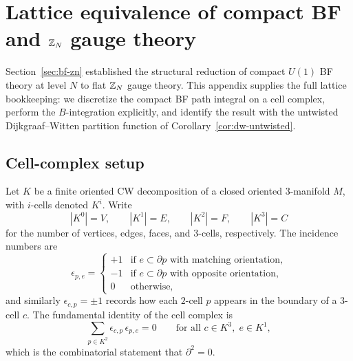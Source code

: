 
\label{app:bf-zn}

\section{Lattice equivalence of compact BF and \texorpdfstring{$\mathbb{Z}_N$}{Z\_N} gauge theory}\label{sec:appD-bf-lattice}

Section~\ref{sec:bf-zn} established the structural reduction of compact $U(1)$ BF theory at level $N$ to flat $\mathbb{Z}_N$ gauge theory. This appendix supplies the full lattice bookkeeping: we discretize the compact BF path integral on a cell complex, perform the $B$-integration explicitly, and identify the result with the untwisted Dijkgraaf--Witten partition function of Corollary~\ref{cor:dw-untwisted}.

\subsection{Cell-complex setup}

Let $K$ be a finite oriented CW decomposition of a closed oriented $3$-manifold $M$, with $i$-cells denoted $K^i$. Write
\begin{equation*}
|K^0|=V,\qquad |K^1|=E,\qquad |K^2|=F,\qquad |K^3|=C
\end{equation*}
for the number of vertices, edges, faces, and $3$-cells, respectively. The incidence numbers are
\begin{equation}\label{eq:appD-incidence}
\epsilon_{p,e}=\begin{cases}+1&\text{if }e\subset\partial p\text{ with matching orientation,}\\-1&\text{if }e\subset\partial p\text{ with opposite orientation,}\\0&\text{otherwise,}\end{cases}
\end{equation}
and similarly $\epsilon_{c,p}=\pm 1$ records how each $2$-cell $p$ appears in the boundary of a $3$-cell $c$. The fundamental identity of the cell complex is
\begin{equation}\label{eq:appD-dd-zero}
\sum_{p\in K^2}\epsilon_{c,p}\,\epsilon_{p,e}=0
\qquad\text{for all }c\in K^3,\;e\in K^1,
\end{equation}
which is the combinatorial statement that $\partial^2=0$.


